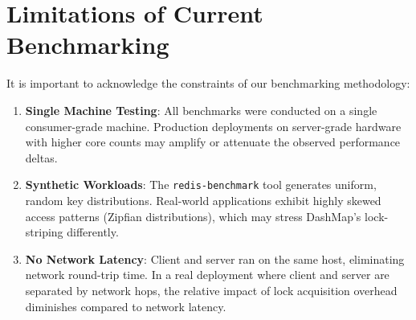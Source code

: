 \section{Limitations of Current Benchmarking}

It is important to acknowledge the constraints of our benchmarking methodology:

\begin{enumerate}[leftmargin=2.5em]
    \item \textbf{Single Machine Testing}: All benchmarks were conducted on a single consumer-grade machine. Production deployments on server-grade hardware with higher core counts may amplify or attenuate the observed performance deltas.
    \item \textbf{Synthetic Workloads}: The \texttt{redis-benchmark} tool generates uniform, random key distributions. Real-world applications exhibit highly skewed access patterns (Zipfian distributions), which may stress DashMap's lock-striping differently.
    \item \textbf{No Network Latency}: Client and server ran on the same host, eliminating network round-trip time. In a real deployment where client and server are separated by network hops, the relative impact of lock acquisition overhead diminishes compared to network latency.
\end{enumerate}

